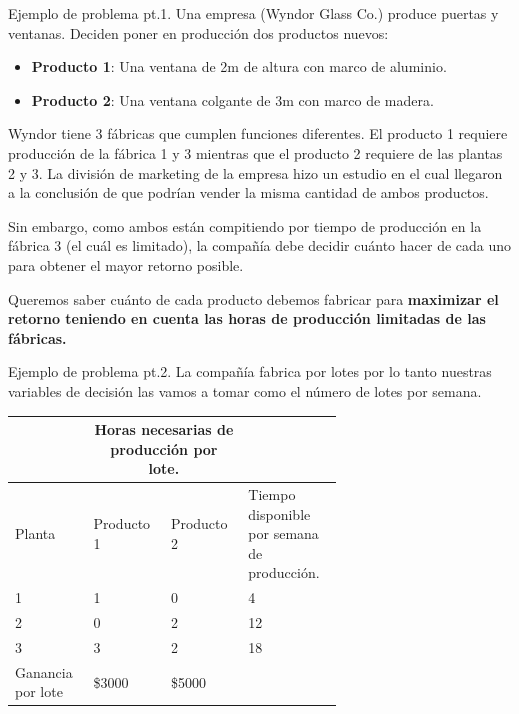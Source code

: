 \documentclass{beamer}
\begin{document}
\begin{frame}[fragile]{Ejemplo de problema pt.1.}
\footnotesize
Una empresa (Wyndor Glass Co.) produce puertas y ventanas. Deciden poner en producción dos productos nuevos:
\begin{itemize}
  \item \textbf{Producto 1}: Una ventana de 2m de altura con marco de aluminio.
  \item \textbf{Producto 2}: Una ventana colgante de 3m con marco de madera.
\end{itemize}


Wyndor tiene 3 fábricas que cumplen funciones diferentes. El producto 1 requiere producción de la fábrica 1 y 3 mientras que el producto 2 requiere de las plantas 2 y 3. La división de marketing de la empresa hizo un estudio en el cual llegaron a la conclusión de que podrían vender la misma cantidad de ambos productos. 

Sin embargo, como ambos están compitiendo por tiempo de producción en la fábrica 3 (el cuál es limitado), la compañía debe decidir cuánto hacer de cada uno para obtener el mayor retorno posible. 

Queremos saber cuánto de cada producto debemos fabricar para \textbf{maximizar el retorno teniendo en cuenta las horas de producción limitadas de las fábricas.}
\end{frame}

\begin{frame}[fragile]{Ejemplo de problema pt.2.}
  La compañía fabrica por lotes por lo tanto nuestras variables de decisión las vamos a tomar como el número de lotes por semana.
  \bigskip
  \footnotesize

  \begin{tabular}{||p{0.15\linewidth} | p{0.15\linewidth} | 
    p{0.15\linewidth}| p{0.2\linewidth}||}
    \hline
    & \multicolumn{2}{|c|}{ Horas necesarias de producción por lote.} & \\
    \hline
    Planta &Producto 1 &Producto 2 & Tiempo disponible por semana de producción.\\
    \hline
    1   & 1    & 0 &  4  \\
    2   & 0    & 2 &  12 \\
    3   & 3    & 2 &  18 \\
    \hline
    Ganancia por lote & \$3000 & \$5000 &  \\
    \hline
  \end{tabular}
\end{frame}
\end{document}
